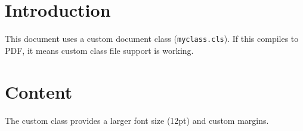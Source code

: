 \documentclass{myclass}
\begin{document}

\section{Introduction}
This document uses a custom document class (\texttt{myclass.cls}).
If this compiles to PDF, it means custom class file support is working.

\section{Content}
The custom class provides a larger font size (12pt) and custom margins.
\end{document}
